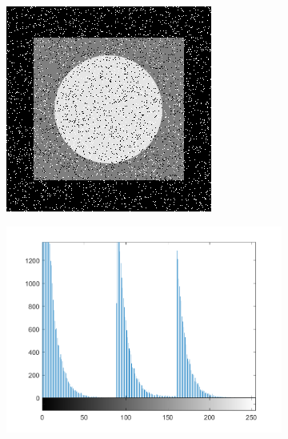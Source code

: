 \begin{figure}[h]
\begin{subfigure}[b]{0.25\linewidth}
		\caption{}
		\label{fig:add_uniform}
	\end{subfigure}
  	\begin{subfigure}[b]{0.25\linewidth}
		\includegraphics[width=\linewidth]{myfigure/p4/41-saltpepper.png}
		\caption{}
		\label{fig:add_saltpepper}
	\end{subfigure}
  	\begin{subfigure}[b]{0.25\linewidth}
		\includegraphics[width=\linewidth]{myfigure/p4/41-exp-hist.png}

\end{subfigure}
\end{figure}
